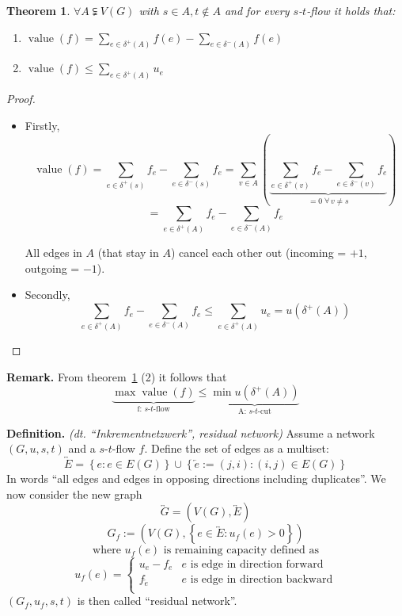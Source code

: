 \documentclass{article}
\newtheorem{theorem}{Theorem}
\newcommand{\set}[1]{\left\{#1\right\}}
\newcommand{\flow}[2]{$#1$-$#2$-flow}
\newcommand{\fall}{\;\forall\,}
\begin{document}
\begin{theorem}
  \label{lemma-4.2}
  $\forall A \subsetneqq V(G)$ with $s \in A, t \notin A$ and for every $s$-$t$-flow it holds that:
  \begin{enumerate}
    \item $\operatorname{value}{(f)} = \sum_{e \in \delta^+(A)} f(e) - \sum_{e \in \delta^-(A)} f(e)$
    \item $\operatorname{value}{(f)} \leq \sum_{e \in \delta^+(A)} u_e$
  \end{enumerate}
\end{theorem}

\begin{proof}
  \begin{itemize}
    \item Firstly, \[
        \operatorname{value}(f)
        = \sum_{e \in \delta^+(s)} f_e - \sum_{e \in \delta^-(s)} f_e
        = \sum_{v \in A} \left(
          \underbrace{\sum_{e \in \delta^+(v)} f_e - \sum_{e \in \delta^-(v)} f_e}%
            _{= 0 \fall v \neq s}
        \right)
      \] \[
        = \sum_{e \in \delta^+(A)} f_e - \sum_{e \in \delta^-(A)} f_e
      \]

      All edges in $A$ (that stay in $A$) cancel each other out
      (incoming = $+1$, outgoing = $-1$).
    \item Secondly, \[
      \sum_{e \in \delta^+(A)} f_e - \sum_{e \in \delta^-(A)} f_e
      \leq \sum_{e \in \delta^+(A)} u_e
      = u(\delta^+(A))
    \]
  \end{itemize}
\end{proof}

\textbf{Remark.}
  From theorem~\ref{lemma-4.2} (2) it follows that
  \[
    \underbrace{\max{\operatorname{value}(f)}}_{\text{f: \flow st}} \leq
    \underbrace{\min{u(\delta^+(A))}}_{\text{A: $s$-$t$-cut}}
  \]

\textbf{Definition.} \emph{(dt. ``Inkrementnetzwerk'', residual network)}
  Assume a network $(G, u, s, t)$ and a \flow st $f$. Define the set of edges as a multiset:
  \[
    \overleftrightarrow E = \set{e: e \in E(G)} \cup \set{\overleftarrow e := (j, i): (i, j) \in E(G)}
  \]
  In words ``all edges and edges in opposing directions including duplicates''.
  We now consider the new graph
  \[
    \overleftrightarrow G = (V(G), \overleftrightarrow E)
  \] \[
    G_f := (V(G), \set{e \in \overleftrightarrow E: u_f(e) > 0})
  \] \[
      \text{ where } u_f(e) \text{ is remaining capacity defined as }
  \] \[
      u_f(e) = \left\{\begin{array}{lc}
        u_e - f_e & e \text{ is edge in direction forward} \\
        f_{\overleftarrow e} & e \text{ is edge in direction backward} \\
      \end{array}\right.
  \]
  $(G_f, u_f, s, t)$ is then called ``residual network''.
\end{document}
